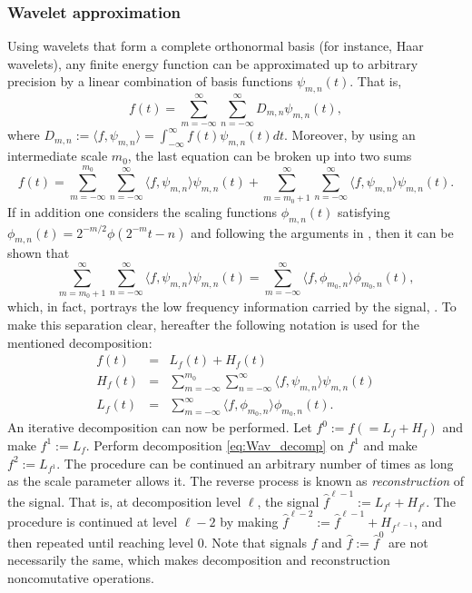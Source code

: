 {\subsubsection{Wavelet approximation}
Using wavelets that form a complete orthonormal basis (for instance, Haar wavelets), any finite energy function can be approximated up to arbitrary precision by a linear combination of basis functions $\psi_{m,n}(t)$. That is,
\begin{equation}
f(t)  = \sum_{m=-\infty}^\infty\sum_{n=-\infty}^\infty D_{m,n}\psi_{m,n}(t),
\end{equation}
where $D_{m,n}:=\langle f,\psi_{m,n}\rangle =\int_{-\infty}^\infty f(t)\psi_{m,n}(t)dt$. 
Moreover, by using an intermediate scale $m_0$, the last equation can be broken up into two sums
\begin{equation}\label{deco0}
f(t)=\sum_{m=-\infty}^{m_0}\sum_{n=-\infty}^\infty\langle f,\psi_{m,n}\rangle\psi_{m,n}(t)+
\sum_{m=m_0+1}^\infty\sum_{n=-\infty}^\infty\langle f,\psi_{m,n}\rangle\psi_{m,n}(t). 
\end{equation}
If in addition one considers the scaling functions $\phi_{m,n}(t)$ satisfying $\phi_{m,n}(t)=2^{-m/2}\phi(2^{-m}t-n)$ and following the arguments in \citep{fofu}, then it can be shown that 
\begin{equation}
\sum_{m=m_0+1}^\infty\sum_{n=-\infty}^\infty\langle f,\psi_{m,n}\rangle\psi_{m,n}(t)=
\sum_{m=-\infty}^\infty\langle f,\phi_{m_0,n}\rangle\phi_{m_0,n}(t),
\end{equation}
which, in fact, portrays the  low frequency information  carried by the signal, . To make this separation clear, hereafter the following notation is used for the mentioned decomposition:
\begin{eqnarray}
f(t)&=&L_f(t)+H_f(t) \label{eq:Wav_decomp}\\
H_f(t)&=&\sum_{m=-\infty}^{m_0}\sum_{n=-\infty}^\infty\langle f,\psi_{m,n}\rangle\psi_{m,n}(t)\\
L_f(t)&=&\sum_{m=-\infty}^\infty\langle f,\phi_{m_0,n}\rangle\phi_{m_0,n}(t).
\end{eqnarray}
An iterative decomposition can now be performed. Let $f^0:= f (= L_f+H_f)$ and make $f^1:= L_f$. Perform decomposition \eqref{eq:Wav_decomp} on $f^1$ and make $f^2:= L_{f^1}$. The procedure can be continued an arbitrary number of times as long as the scale parameter allows it. The reverse process is known as \emph{reconstruction} of the signal. That is, at decomposition level $\ell $, the signal $\hat{f}^{\ell -1} := L_{f^{\ell }}+H_{f^{\ell }}$. The procedure is continued at level $\ell -2$ by making $\hat{f}^{\ell -2} := \hat{f}^{\ell -1}+H_{f^{\ell -1}}$, and then repeated until reaching level $0$. Note that signals $f$ and $\hat{f} := \hat{f}^0$ are not necessarily the same, which makes decomposition and reconstruction noncomutative operations.  


}
